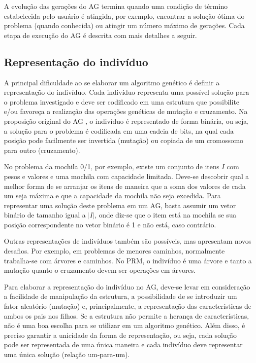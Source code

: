 A evolução das gerações do AG termina quando uma condição de término estabelecida pelo usuário é atingida, por exemplo, encontrar a solução ótima do problema (quando conhecida) ou atingir um número máximo de gerações. Cada etapa de execução do AG é descrita com mais detalhes a seguir.

\subsection{Representação do indivíduo}
A principal dificuldade ao se elaborar um algoritmo genético é definir a representação do indivíduo. Cada indivíduo representa uma possível solução para o problema investigado e deve ser codificado em uma estrutura que possibilite e/ou favoreça a realização das operações genéticas de mutação e cruzamento. Na proposição original do AG \cite{Goldberg1989}, o indivíduo é representado de forma binária, ou seja, a solução para o problema é codificada em uma cadeia de bits, na qual cada posição pode facilmente ser invertida (mutação) ou copiada de um cromossomo para outro (cruzamento).

No problema da mochila 0/1, por exemplo, existe um conjunto de itens $I$ com pesos e valores e uma mochila com capacidade limitada. Deve-se descobrir qual a melhor forma de se arranjar os itens de maneira que a soma dos valores de cada um seja máxima e que a capacidade da mochila não seja excedida. Para representar uma solução deste problema em um AG, basta assumir um vetor binário de tamanho igual a $|I|$, onde diz-se que o item está na mochila se sua posição correspondente no vetor binário é 1 e não está, caso contrário.

Outras representações de indivíduos também são possíveis, mas apresentam novos desafios. Por exemplo, em problemas de menores caminhos, normalmente trabalha-se com árvores e caminhos. No PRM, o indivíduo é uma árvore e tanto a mutação quanto o cruzamento devem ser operações em árvores.

Para elaborar a representação do indivíduo no AG, deve-se levar em consideração a facilidade de manipulação da estrutura, a possibilidade de se introduzir um fator aleatório (mutação) e, principalmente, a representação das características de ambos os pais nos filhos. Se a estrutura não permite a herança de características, não é uma boa escolha para se utilizar em um algoritmo genético. Além disso, é preciso garantir a unicidade da forma de representação, ou seja, cada solução pode ser representada de uma única maneira e cada indivíduo deve representar uma única solução (relação um-para-um).

